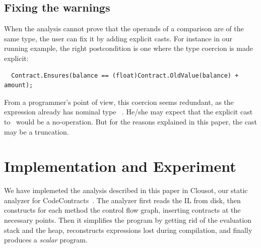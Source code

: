\documentclass{entcs}
\newcommand{\Float}{\code{float32}\ }
\begin{document}
\subsection{Fixing the warnings}

When the analysis cannot prove that the operands of a comparison are of the same type, the user can fix it by adding explicit casts.
For instance in our running example, the right postcondition is one
where the type coercion is made explicit:
\begin{lstlisting}
  Contract.Ensures(balance == (float)Contract.OldValue(balance) + amount);
\end{lstlisting}
From a programmer's point of view, this coercion seems redundant, as
the expression  already has
nominal type \Float. He/she may expect that the explicit cast to
\Float would be a  no-operation. But for the reasons explained in this
paper, the cast may be a truncation.


\section{Implementation and Experiment}

We have implemeted the  analysis described in this paper in Clousot, our static analyzer for CodeContracts~\cite{MafLogozzo10}.
The analyzer first reads the IL from disk, then constructs for each
method the control flow graph, inserting  contracts at the necessary points.
Then it simplifies the program by getting rid of the evaluation stack
and the heap, reconstructs expressions lost during compilation, and
finally produces a \emph{scalar} program.
\end{document}
